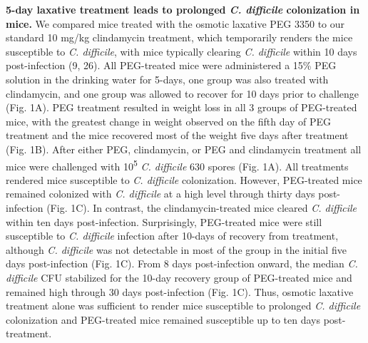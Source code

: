 \documentclass[
  11pt,
]{article}
\begin{document}
\textbf{5-day laxative treatment leads to prolonged \emph{C. difficile}
colonization in mice.} We compared mice treated with the osmotic
laxative PEG 3350 to our standard 10 mg/kg clindamycin treatment, which
temporarily renders the mice susceptible to \emph{C. difficile}, with
mice typically clearing \emph{C. difficile} within 10 days
post-infection (9, 26). All PEG-treated mice were administered a 15\%
PEG solution in the drinking water for 5-days, one group was also
treated with clindamycin, and one group was allowed to recover for 10
days prior to challenge (Fig. 1A). PEG treatment resulted in weight loss
in all 3 groups of PEG-treated mice, with the greatest change in weight
observed on the fifth day of PEG treatment and the mice recovered most
of the weight five days after treatment (Fig. 1B). After either PEG,
clindamycin, or PEG and clindamycin treatment all mice were challenged
with 10\textsuperscript{5} \emph{C. difficile} 630 spores (Fig. 1A). All
treatments rendered mice susceptible to \emph{C. difficile}
colonization. However, PEG-treated mice remained colonized with \emph{C.
difficile} at a high level through thirty days post-infection (Fig. 1C).
In contrast, the clindamycin-treated mice cleared \emph{C. difficile}
within ten days post-infection. Surprisingly, PEG-treated mice were
still susceptible to \emph{C. difficile} infection after 10-days of
recovery from treatment, although \emph{C. difficile} was not detectable
in most of the group in the initial five days post-infection (Fig. 1C).
From 8 days post-infection onward, the median \emph{C. difficile} CFU
stabilized for the 10-day recovery group of PEG-treated mice and
remained high through 30 days post-infection (Fig. 1C). Thus, osmotic
laxative treatment alone was sufficient to render mice susceptible to
prolonged \emph{C. difficile} colonization and PEG-treated mice remained
susceptible up to ten days post-treatment.
\end{document}
